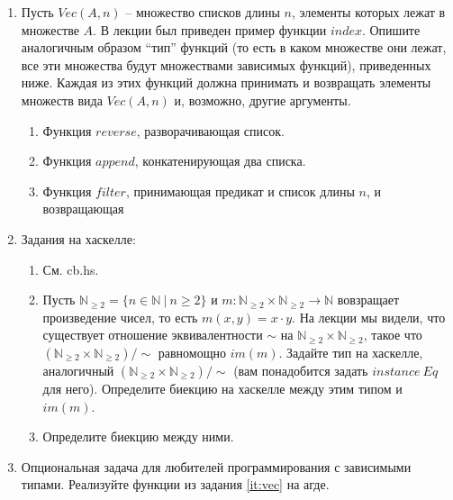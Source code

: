 \documentclass[draft]{article}
\begin{document}
\begin{enumerate}
\item \label{it:vec}
    Пусть $Vec(A,n)$ -- множество списков длины $n$, элементы которых лежат в множестве $A$.
    В лекции был приведен пример функции $index$.
    Опишите аналогичным образом ``тип'' функций (то есть в каком множестве они лежат, все эти множества будут множествами зависимых функций), приведенных ниже.
    Каждая из этих функций должна принимать и возвращать элементы множеств вида $Vec(A,n)$ и, возможно, другие аргументы.
\begin{enumerate}
\item Функция $reverse$, разворачивающая список.
\item Функция $append$, конкатенирующая два списка.
\item Функция $filter$, принимающая предикат и список длины $n$, и возвращающая
\end{enumerate}

\item Задания на хаскелле:
\begin{enumerate}
\item См. cb.hs.
\item Пусть $\mathbb{N}_{\geq 2} = \{ n \in \mathbb{N}\ |\ n \geq 2 \}$ и $m : \mathbb{N}_{\geq 2} \times \mathbb{N}_{\geq 2} \to \mathbb{N}$ вовзращает произведение чисел, то есть $m(x,y) = x \cdot y$.
    На лекции мы видели, что существует отношение эквивалентности $\sim$ на $\mathbb{N}_{\geq 2} \times \mathbb{N}_{\geq 2}$, такое что $(\mathbb{N}_{\geq 2} \times \mathbb{N}_{\geq 2})/\!\!\sim$ равномощно $im(m)$.
    Задайте тип на хаскелле, аналогичный $(\mathbb{N}_{\geq 2} \times \mathbb{N}_{\geq 2})/\!\!\sim$ (вам понадобится задать $instance\ Eq$ для него).
    Определите биекцию на хаскелле между этим типом и $im(m)$.
\item
{}
    Определите биекцию между ними.
\end{enumerate}

\item Опциональная задача для любителей программирования с зависимыми типами. Реализуйте функции из задания \ref{it:vec} на агде.

\end{enumerate}
\end{document}
